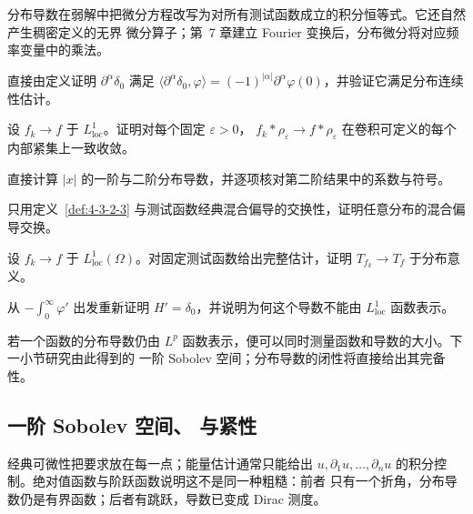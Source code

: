 分布导数在弱解中把微分方程改写为对所有测试函数成立的积分恒等式。它还自然产生稠密定义的无界
微分算子；第~7 章建立 Fourier 变换后，分布微分将对应频率变量中的乘法。

\begin{exercise}
直接由定义证明 $\partial^\alpha\delta_0$ 满足
$\langle\partial^\alpha\delta_0,\varphi\rangle
=(-1)^{|\alpha|}\partial^\alpha\varphi(0)$，并验证它满足分布连续性估计。
\end{exercise}

\begin{exercise}
设 $f_k\to f$ 于 $L^1_{\mathrm{loc}}$。证明对每个固定 $\varepsilon>0$，
$f_k*\rho_\varepsilon\to f*\rho_\varepsilon$ 在卷积可定义的每个内部紧集上一致收敛。
\end{exercise}

\begin{exercise}
直接计算 $|x|$ 的一阶与二阶分布导数，并逐项核对第二阶结果中的系数与符号。
\end{exercise}

\begin{exercise}
只用定义~\ref{def:4-3-2-3} 与测试函数经典混合偏导的交换性，证明任意分布的混合偏导交换。
\end{exercise}

\begin{exercise}
设 $f_k\to f$ 于 $L^1_{\mathrm{loc}}(\Omega)$。对固定测试函数给出完整估计，证明
$T_{f_k}\to T_f$ 于分布意义。
\end{exercise}

\begin{exercise}
从 $-\int_0^\infty\varphi'$ 出发重新证明 $H'=\delta_0$，并说明为何这个导数不能由
$L^1_{\mathrm{loc}}$ 函数表示。
\end{exercise}

若一个函数的分布导数仍由 $L^p$ 函数表示，便可以同时测量函数和导数的大小。下一小节研究由此得到的
一阶 Sobolev 空间；分布导数的闭性将直接给出其完备性。

\subsection{一阶 Sobolev 空间、\Poincare{} 与紧性}\label{subsec:4-3-3}

经典可微性把要求放在每一点；能量估计通常只能给出
$u,\partial_1u,\ldots,\partial_n u$ 的积分控制。绝对值函数与阶跃函数说明这不是同一种粗糙：前者
只有一个折角，分布导数仍是有界函数；后者有跳跃，导数已变成 Dirac 测度。

